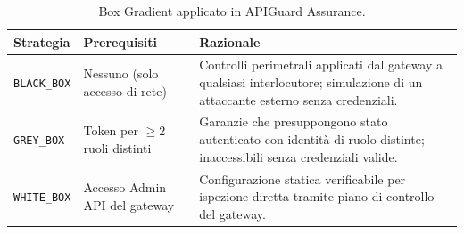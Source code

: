 \begin{table}[ht]
  \centering
  \small
  \begin{tabularx}{\textwidth}{@{} l l >{\raggedright\arraybackslash}X @{}}
    \toprule
    \textbf{Strategia}  & \textbf{Prerequisiti}               & \textbf{Razionale}                                                                                                             \\
    \midrule
    \texttt{BLACK\_BOX} & Nessuno (solo accesso di rete)      & Controlli perimetrali applicati dal gateway a qualsiasi interlocutore; simulazione di un attaccante esterno senza credenziali. \\
    \addlinespace
    \texttt{GREY\_BOX}  & Token per $\geq 2$ ruoli distinti   & Garanzie che presuppongono stato autenticato con identità di ruolo distinte; inaccessibili senza credenziali valide.           \\
    \addlinespace
    \texttt{WHITE\_BOX} & Accesso Admin \gls{API} del gateway & Configurazione statica verificabile per ispezione diretta tramite piano di controllo del gateway.                              \\
    \bottomrule
  \end{tabularx}
  \caption{Box Gradient applicato in APIGuard Assurance.}
  \label{tab:box-gradient}
\end{table}